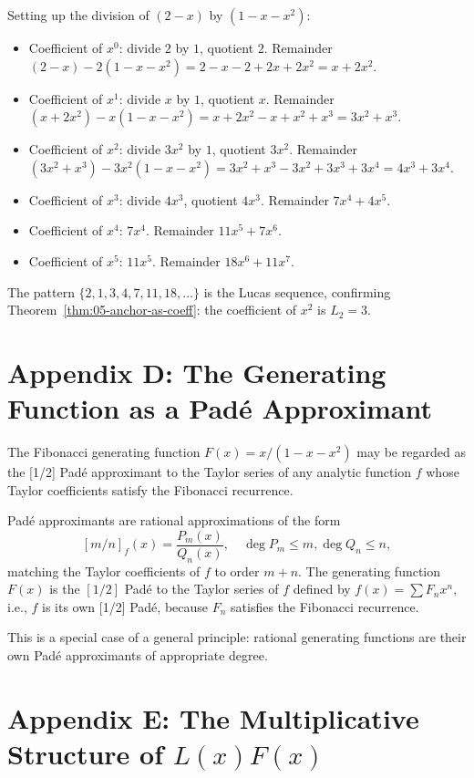 Setting up the division of $(2 - x)$ by $(1 - x - x^2)$:

\begin{itemize}
  \item Coefficient of $x^0$: divide $2$ by $1$, quotient $2$. Remainder
        $(2 - x) - 2(1 - x - x^2) = 2 - x - 2 + 2x + 2x^2 = x + 2x^2$.
  \item Coefficient of $x^1$: divide $x$ by $1$, quotient $x$. Remainder
        $(x + 2x^2) - x(1 - x - x^2) = x + 2x^2 - x + x^2 + x^3 = 3x^2 + x^3$.
  \item Coefficient of $x^2$: divide $3x^2$ by $1$, quotient $3x^2$.
        Remainder $(3x^2 + x^3) - 3x^2(1 - x - x^2) = 3x^2 + x^3 - 3x^2 + 3x^3 + 3x^4 = 4x^3 + 3x^4$.
  \item Coefficient of $x^3$: divide $4x^3$, quotient $4x^3$. Remainder
        $7x^4 + 4x^5$.
  \item Coefficient of $x^4$: $7x^4$. Remainder $11x^5 + 7x^6$.
  \item Coefficient of $x^5$: $11x^5$. Remainder $18x^6 + 11x^7$.
\end{itemize}

The pattern $\{2, 1, 3, 4, 7, 11, 18, \ldots\}$ is the Lucas sequence,
confirming Theorem~\ref{thm:05-anchor-as-coeff}: the coefficient of $x^2$
is $L_2 = 3$.

\section*{Appendix D: The Generating Function as a Padé Approximant}
\label{fa_05:sec:05-app-D}

The Fibonacci generating function $F(x) = x/(1-x-x^2)$ may be regarded
as the [1/2] Padé approximant to the Taylor series of any analytic
function $f$ whose Taylor coefficients satisfy the Fibonacci recurrence.

Padé approximants are rational approximations of the form
\[
  [m/n]_f(x) = \frac{P_m(x)}{Q_n(x)}, \quad \deg P_m \le m, \deg Q_n \le n,
\]
matching the Taylor coefficients of $f$ to order $m + n$. The
generating function $F(x)$ is the $[1/2]$ Padé to the Taylor series
of $f$ defined by $f(x) = \sum F_n x^n$, i.e., $f$ is its own [1/2] Padé,
because $F_n$ satisfies the Fibonacci recurrence.

This is a special case of a general principle: rational generating
functions are their own Padé approximants of appropriate degree.

\section*{Appendix E: The Multiplicative Structure of $L(x) F(x)$}
\label{fa_05:sec:05-app-E}

